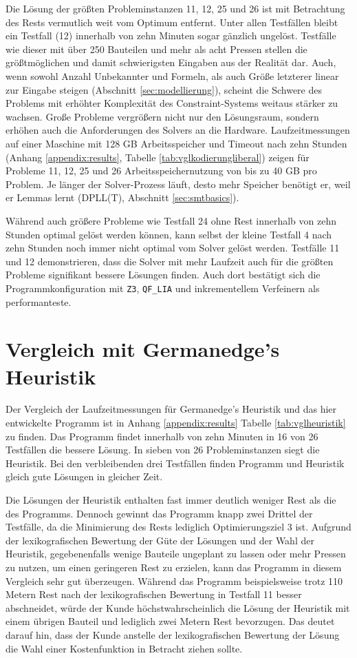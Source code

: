 Die Lösung der größten Probleminstanzen 11, 12, 25 und 26 ist mit Betrachtung des Rests vermutlich weit vom Optimum entfernt.
Unter allen Testfällen bleibt ein Testfall (12) innerhalb von zehn Minuten sogar gänzlich ungelöst.
Testfälle wie dieser mit über 250 Bauteilen und mehr als acht Pressen stellen die größtmöglichen und damit schwierigsten Eingaben aus der Realität dar.
Auch, wenn sowohl Anzahl Unbekannter und Formeln, als auch Größe letzterer linear zur Eingabe steigen (Abschnitt \ref{sec:modellierung}),
scheint die Schwere des Problems mit erhöhter Komplexität des Constraint-Systems weitaus stärker zu wachsen.
Große Probleme vergrößern nicht nur den Lösungsraum, sondern erhöhen auch die Anforderungen des Solvers an die Hardware.
Laufzeitmessungen auf einer Maschine mit 128 GB Arbeitsspeicher und Timeout nach zehn Stunden (Anhang \ref{appendix:results}, Tabelle \ref{tab:vglkodierungliberal}) zeigen für Probleme
11, 12, 25 und 26 Arbeitsspeichernutzung von bis zu 40 GB pro Problem.
Je länger der Solver-Prozess läuft, desto mehr Speicher benötigt er, weil er Lemmas lernt (DPLL(T), Abschnitt \ref{sec:smtbasics}).

Während auch größere Probleme wie Testfall 24 ohne Rest innerhalb von zehn Stunden optimal gelöst werden können, kann selbst der kleine Testfall 4 nach zehn Stunden
noch immer nicht optimal vom Solver gelöst werden.
Testfälle 11 und 12 demonstrieren, dass die Solver mit mehr Laufzeit auch für die größten Probleme signifikant bessere Lösungen finden.
Auch dort bestätigt sich die Programmkonfiguration mit \texttt{Z3}, \texttt{QF\_LIA} und inkrementellem Verfeinern als performanteste.

\section{Vergleich mit Germanedge's Heuristik}
Der Vergleich der Laufzeitmessungen für Germanedge's Heuristik und das hier entwickelte Programm ist in Anhang \ref{appendix:results} Tabelle \ref{tab:vglheuristik} zu finden.
Das Programm findet innerhalb von zehn Minuten in 16 von 26 Testfällen die bessere Lösung.
In sieben von 26 Probleminstanzen siegt die Heuristik.
Bei den verbleibenden drei Testfällen finden Programm und Heuristik gleich gute Lösungen in gleicher Zeit.

Die Lösungen der Heuristik enthalten fast immer deutlich weniger Rest als die des Programms.
Dennoch gewinnt das Programm knapp zwei Drittel der Testfälle, da die Minimierung des Rests lediglich Optimierungsziel 3 ist.
Aufgrund der lexikografischen Bewertung der Güte der Lösungen und der Wahl der Heuristik, gegebenenfalls wenige Bauteile ungeplant zu lassen oder mehr Pressen zu nutzen,
um einen geringeren Rest zu erzielen, kann das Programm in diesem Vergleich sehr gut überzeugen.
Während das Programm beispielsweise trotz 110 Metern Rest nach der lexikografischen Bewertung in Testfall 11 besser abschneidet, würde der Kunde höchstwahrscheinlich die
Lösung der Heuristik mit einem übrigen Bauteil und lediglich zwei Metern Rest bevorzugen.
Das deutet darauf hin, dass der Kunde anstelle der lexikografischen Bewertung der Lösung die Wahl einer Kostenfunktion in Betracht ziehen sollte.

